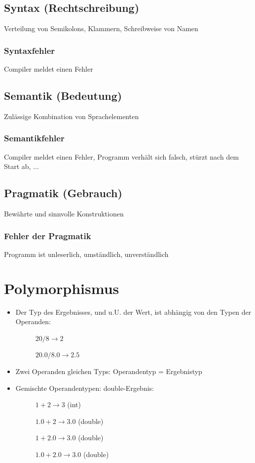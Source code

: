 \subsection{Syntax (Rechtschreibung)}
Verteilung von Semikolons, Klammern, Schreibweise von Namen
\subsubsection{Syntaxfehler}
Compiler meldet einen Fehler

\subsection{Semantik (Bedeutung)}
Zulässige Kombination von Sprachelementen
\subsubsection{Semantikfehler}
Compiler meldet einen Fehler, Programm verhält sich falsch, stürzt
nach dem Start ab, ...

\subsection{Pragmatik (Gebrauch)}
Bewährte und sinnvolle Konstruktionen
\subsubsection{Fehler der Pragmatik}
Programm ist unleserlich, umständlich, unverständlich
%
%
%
\section{Polymorphismus}
\begin{itemize}
	\item Der Typ des Ergebnisses, und u.U. der Wert, ist abhängig von
	den Typen der Operanden:
	\begin{description}
		\item []$ 20/8 \rightarrow 2 $
		\item []$20.0/8.0 \rightarrow 2.5$
	\end{description}
	\item Zwei Operanden gleichen Typs: Operandentyp = Ergebnistyp
	\item Gemischte Operandentypen: double-Ergebnis:
	\begin{description}
		\item [] $1 + 2 \rightarrow 3$ (int)
		\item [] $1.0 + 2 \rightarrow 3.0$ (double)
		\item[] $1 + 2.0 \rightarrow 3.0$ (double)
		\item[] $1.0+2.0 \rightarrow 3.0$ (double)
	\end{description}
\end{itemize}
%
%
%
